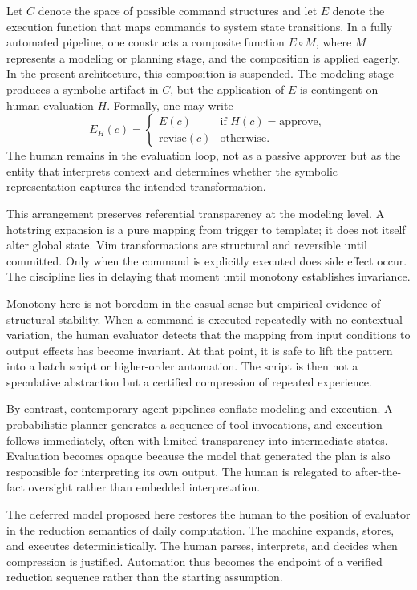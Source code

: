 \documentclass[11pt]{article}
\begin{document}
Let \(C\) denote the space of possible command structures and let \(E\) denote the execution function that maps commands to system state transitions. In a fully automated pipeline, one constructs a composite function \(E \circ M\), where \(M\) represents a modeling or planning stage, and the composition is applied eagerly. In the present architecture, this composition is suspended. The modeling stage produces a symbolic artifact in \(C\), but the application of \(E\) is contingent on human evaluation \(H\). Formally, one may write
\[
E_H(c) =
\begin{cases}
E(c) & \text{if } H(c) = \text{approve}, \\
\text{revise}(c) & \text{otherwise}.
\end{cases}
\]
The human remains in the evaluation loop, not as a passive approver but as the entity that interprets context and determines whether the symbolic representation captures the intended transformation.

This arrangement preserves referential transparency at the modeling level. A hotstring expansion is a pure mapping from trigger to template; it does not itself alter global state. Vim transformations are structural and reversible until committed. Only when the command is explicitly executed does side effect occur. The discipline lies in delaying that moment until monotony establishes invariance.

Monotony here is not boredom in the casual sense but empirical evidence of structural stability. When a command is executed repeatedly with no contextual variation, the human evaluator detects that the mapping from input conditions to output effects has become invariant. At that point, it is safe to lift the pattern into a batch script or higher-order automation. The script is then not a speculative abstraction but a certified compression of repeated experience.

By contrast, contemporary agent pipelines conflate modeling and execution. A probabilistic planner generates a sequence of tool invocations, and execution follows immediately, often with limited transparency into intermediate states. Evaluation becomes opaque because the model that generated the plan is also responsible for interpreting its own output. The human is relegated to after-the-fact oversight rather than embedded interpretation.

The deferred model proposed here restores the human to the position of evaluator in the reduction semantics of daily computation. The machine expands, stores, and executes deterministically. The human parses, interprets, and decides when compression is justified. Automation thus becomes the endpoint of a verified reduction sequence rather than the starting assumption.
\end{document}

